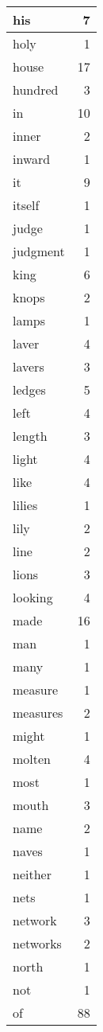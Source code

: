 \begin{center}
\begin{longtable}{l|r}
his & 7 \\ \hline
holy & 1 \\ \hline
house & 17 \\ \hline
hundred & 3 \\ \hline
in & 10 \\ \hline
inner & 2 \\ \hline
inward & 1 \\ \hline
it & 9 \\ \hline
itself & 1 \\ \hline
judge & 1 \\ \hline
judgment & 1 \\ \hline
king & 6 \\ \hline
knops & 2 \\ \hline
lamps & 1 \\ \hline
laver & 4 \\ \hline
lavers & 3 \\ \hline
ledges & 5 \\ \hline
left & 4 \\ \hline
length & 3 \\ \hline
light & 4 \\ \hline
like & 4 \\ \hline
lilies & 1 \\ \hline
lily & 2 \\ \hline
line & 2 \\ \hline
lions & 3 \\ \hline
looking & 4 \\ \hline
made & 16 \\ \hline
man & 1 \\ \hline
many & 1 \\ \hline
measure & 1 \\ \hline
measures & 2 \\ \hline
might & 1 \\ \hline
molten & 4 \\ \hline
most & 1 \\ \hline
mouth & 3 \\ \hline
name & 2 \\ \hline
naves & 1 \\ \hline
neither & 1 \\ \hline
nets & 1 \\ \hline
network & 3 \\ \hline
networks & 2 \\ \hline
north & 1 \\ \hline
not & 1 \\ \hline
of & 88 \\ \hline

\end{longtable}
\end{center}
